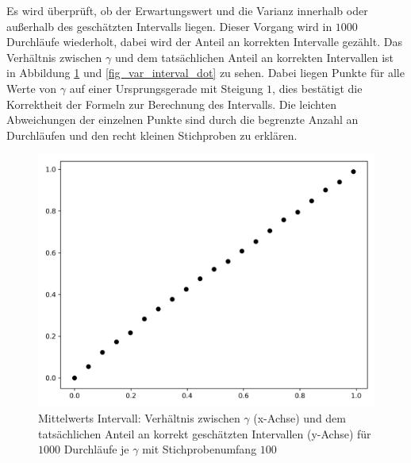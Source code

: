 \documentclass[10pt,twocolumn]{scrartcl}
\begin{document}
		Es wird überprüft, ob der Erwartungswert und die Varianz innerhalb oder außerhalb des geschätzten Intervalls liegen. Dieser Vorgang wird in $1000$ Durchläufe wiederholt, dabei wird der Anteil an korrekten Intervalle gezählt. Das Verhältnis zwischen $\gamma$ und dem tatsächlichen Anteil an korrekten Intervallen ist in Abbildung \ref{fig_mean_interval_dot} und \ref{fig_var_interval_dot} zu sehen. Dabei liegen Punkte für alle Werte von $\gamma$ auf einer Ursprungsgerade mit Steigung $1$, dies bestätigt die Korrektheit der Formeln zur Berechnung des Intervalls. Die leichten Abweichungen der einzelnen Punkte sind durch die begrenzte Anzahl an Durchläufen und den recht kleinen Stichproben zu erklären.


		\begin{figure}[H]
			\centering
			\includegraphics[width=0.9\columnwidth]{images/mean_interval.png}
			\caption{Mittelwerts Intervall: Verhältnis zwischen $\gamma$ (x-Achse) und dem tatsächlichen Anteil an korrekt geschätzten Intervallen (y-Achse) für $1000$ Durchläufe je $\gamma$ mit Stichprobenumfang $100$}
			\label{fig_mean_interval_dot}
		\end{figure}
\end{document}
